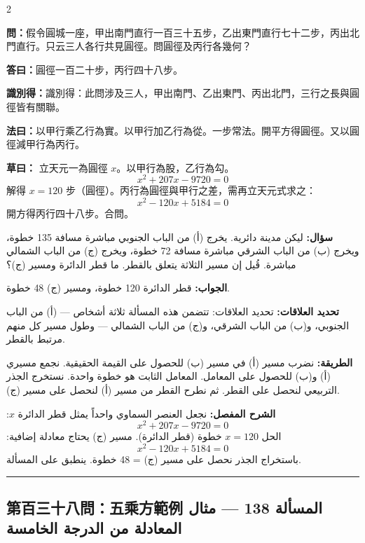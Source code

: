\documentclass[11pt,a4paper]{article}
\newcommand{\ar}[1]{\arabicfont\beginR #1\endR}
\newcommand{\arb}[1]{\textbf{\arabicfont\beginR #1\endR}}
\newcommand{\longline}{\noindent\rule{\textwidth}{0.4pt}}
\newcommand{\arnote}[1]{\textcolor{arabicblue}{\ar{#1}}}
\newcommand{\wen}[1]{\par\noindent\textbf{\textcolor{probcolor}{問：}}{#1}\par}
\newcommand{\da}[1]{\par\noindent\textbf{\textcolor{anscolor}{答曰：}}{#1}\par}
\newcommand{\fayue}[1]{\par\noindent\textbf{\textcolor{methodcolor}{法曰：}}{#1}\par}
\newcommand{\caoyue}[1]{\par\noindent\textbf{草曰：}{#1}\par}
\newcommand{\zhi}[1]{\par\noindent\textbf{識別得：}{#1}\par}
\newcommand{\arwen}[1]{\par\noindent\arb{سؤال: }\arnote{#1}\par}
\newcommand{\arjwb}[1]{\par\noindent\arb{الجواب: }\arnote{#1}\par}
\newcommand{\arqwd}[1]{\par\noindent\arb{الطريقة: }\arnote{#1}\par}
\newcommand{\arshr}[1]{\par\noindent\arb{الشرح المفصل: }\arnote{#1}\par}
\newcommand{\arfl}[1]{\par\noindent\arb{تحديد العلاقات: }\arnote{#1}\par}
\begin{document}
\begin{paracol}{2}

\begin{leftcolumn}
\wen{假令圓城一座，甲出南門直行一百三十五步，乙出東門直行七十二步，丙出北門直行。只云三人各行共見圓徑。問圓徑及丙行各幾何？}

\da{圓徑一百二十步，丙行四十八步。}

\zhi{識別得：此問涉及三人，甲出南門、乙出東門、丙出北門，三行之長與圓徑皆有關聯。}

\fayue{以甲行乘乙行為實。以甲行加乙行為從。一步常法。開平方得圓徑。又以圓徑減甲行為丙行。}

\caoyue{
立天元一為圓徑 $x$。以甲行為股，乙行為勾。
$$x^2 + 207x - 9720 = 0$$
解得 $x = 120$ 步（圓徑）。丙行為圓徑與甲行之差，需再立天元式求之：
$$x^2 - 120x + 5184 = 0$$
開方得丙行四十八步。合問。}
\end{leftcolumn}

\begin{rightcolumn}
\arwen{ليكن مدينة دائرية. يخرج (أ) من الباب الجنوبي مباشرة مسافة 135 خطوة، ويخرج (ب) من الباب الشرقي مباشرة مسافة 72 خطوة، ويخرج (ج) من الباب الشمالي مباشرة. قُيل إن مسير الثلاثة يتعلق بالقطر. ما قطر الدائرة ومسير (ج)؟}

\arjwb{قطر الدائرة 120 خطوة، ومسير (ج) 48 خطوة.}

\arfl{تحديد العلاقات: تتضمن هذه المسألة ثلاثة أشخاص — (أ) من الباب الجنوبي، و(ب) من الباب الشرقي، و(ج) من الباب الشمالي — وطول مسير كل منهم مرتبط بالقطر.}

\arqwd{نضرب مسير (أ) في مسير (ب) للحصول على القيمة الحقيقية. نجمع مسيري (أ) و(ب) للحصول على المعامل. المعامل الثابت هو خطوة واحدة. نستخرج الجذر التربيعي لنحصل على القطر. ثم نطرح القطر من مسير (أ) لنحصل على مسير (ج).}

\arshr{نجعل العنصر السماوي واحداً يمثل قطر الدائرة $x$:
$$x^2 + 207x - 9720 = 0$$
الحل $x = 120$ خطوة (قطر الدائرة). مسير (ج) يحتاج معادلة إضافية:
$$x^2 - 120x + 5184 = 0$$
باستخراج الجذر نحصل على مسير (ج) = 48 خطوة. ينطبق على المسألة.}
\end{rightcolumn}

\end{paracol}

\vspace{0.3cm}
\longline

\subsection*{第百三十八問：五乘方範例 \hfill \ar{المسألة 138 — مثال المعادلة من الدرجة الخامسة}}
\end{document}
